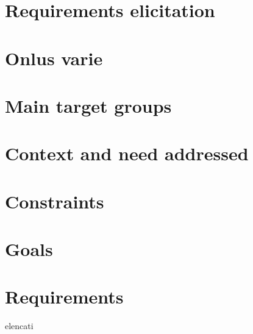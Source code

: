 \section{Requirements elicitation}
\section{Onlus varie}
\section{Main target groups}
\section{Context and need addressed}
\section{Constraints}
\section{Goals}
\section{Requirements}
elencati